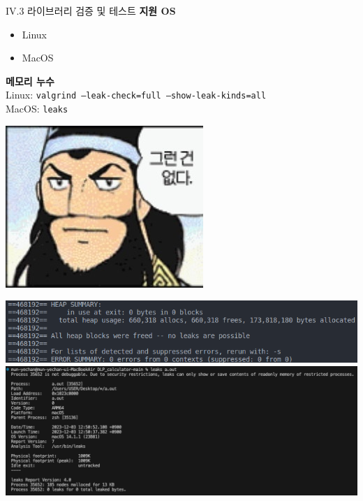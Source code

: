 \documentclass{beamer}
\begin{document}
\begin{frame}{IV.3 라이브러리 검증 및 테스트}
	\alert{\bf 지원 OS}\\
	\begin{itemize}
		\item Linux
		\item MacOS
	\end{itemize}
	\alert{\bf 메모리 누수}\\
	Linux: \texttt{valgrind --leak-check=full --show-leak-kinds=all}\\
	MacOS: \texttt{leaks}\\
	\begin{center}
		\begin{minipage}{.4\linewidth}
			\includegraphics[scale=1.5]{lib1.jpeg}
		\end{minipage}
	\begin{minipage}{.55\linewidth}
	\includegraphics[scale=.25]{lib2.png}\\
	\includegraphics[scale=.15]{lib2_1.png}
\end{minipage}
	\end{center}
\end{frame}
\end{document}
